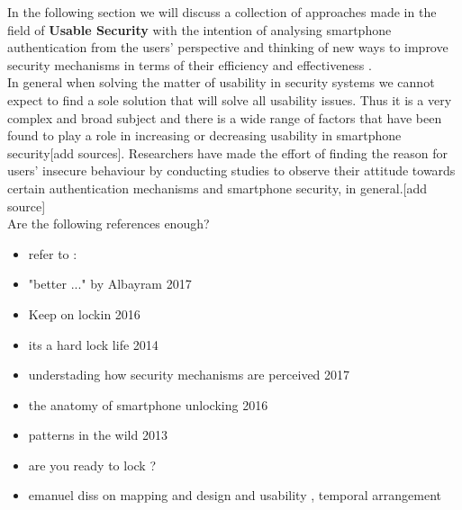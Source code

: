In the following section we will discuss a collection of approaches made in the field of \textbf{Usable Security} with the intention of analysing smartphone authentication from the users' perspective and thinking of new ways to improve security mechanisms in terms of their efficiency and effectiveness \cite{anonymous}. \\

In general when solving the matter of usability in security systems we cannot expect to find a sole solution that will solve all usability issues. Thus it is a very complex and broad subject and there is a wide range of factors that have been found to play a role in increasing or decreasing usability in smartphone security[add sources]. Researchers have made the effort of finding the reason for users' insecure behaviour by conducting studies to observe their attitude towards certain authentication mechanisms and smartphone security, in general.[add source] \\

Are the following references enough? 

\begin{itemize}
    \item refer to : 
    \item "better ..." by Albayram 2017
    \item Keep on lockin 2016
    \item its a hard lock life 2014
    \item understading how security mechanisms are perceived 2017
    \item the anatomy of smartphone unlocking 2016
    \item patterns in the wild 2013
    \item are you ready to lock ?
    \item emanuel diss on mapping and design and usability , temporal arrangement 
\end{itemize}






